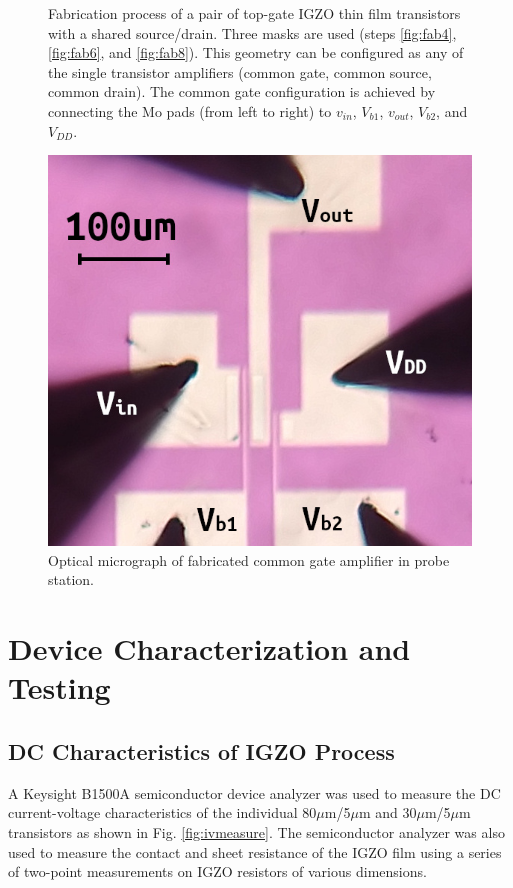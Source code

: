 \documentclass[conference]{IEEEtran}
\begin{document}
\begin{figure}[htbp]
{    }
    \quad
    \caption{
        Fabrication process of a pair of top-gate IGZO thin film transistors with a shared source/drain.
        Three masks are used (steps \ref{fig:fab4}, \ref{fig:fab6}, and \ref{fig:fab8}).
        This geometry can be configured as any of the single transistor amplifiers (common gate, common source, common drain).
        The common gate configuration is achieved by connecting the Mo pads (from left to right) to $v_{in}$, $V_{b1}$, $v_{out}$, $V_{b2}$, and $V_{DD}$.
    }
    \label{fig:fab}
\end{figure}

\begin{figure}[htbp]
    \centering
    \includegraphics[width=0.6\columnwidth]{images/device_photo.jpg}
    \caption{Optical micrograph of fabricated common gate amplifier in probe station.}
    \label{fig:probestation}
\end{figure}

\section{Device Characterization and Testing}

\subsection{DC Characteristics of IGZO Process}
A Keysight B1500A semiconductor device analyzer was used to measure the DC current-voltage characteristics of the individual 80$\mu$m/5$\mu$m and 30$\mu$m/5$\mu$m transistors as shown in Fig. \ref{fig:ivmeasure}.
The semiconductor analyzer was also used to measure the contact and sheet resistance of the IGZO film using a series of two-point measurements on IGZO resistors of various dimensions.
\end{document}
